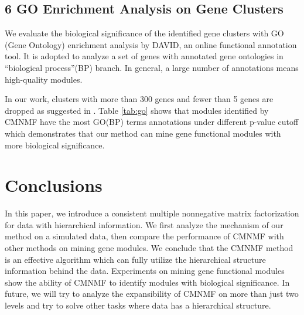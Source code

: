 \documentclass{bmcart}
\begin{document}
\subsection*{6 GO Enrichment Analysis on Gene Clusters}

We evaluate the biological significance of the identified gene clusters with GO (Gene Ontology) enrichment analysis by DAVID\cite{David}, an online functional annotation tool. It is adopted to analyze a set of genes with annotated gene ontologies in ``biological process''(BP) branch. In general, a large number of annotations means high-quality modules.

In our work, clusters with more than 300 genes and fewer than 5 genes are dropped as suggested in \cite{SMNMF}. Table \ref{tab:go} shows that modules identified by CMNMF have the most GO(BP) terms annotations under different p-value cutoff which demonstrates that our method can mine gene functional modules with more biological significance.

\section*{Conclusions}
In this paper, we introduce a consistent multiple nonnegative matrix factorization for data with hierarchical information. We first analyze the mechanism of our method on a simulated data, then compare the performance of CMNMF with other methods on mining gene modules. We conclude that the CMNMF method is an effective algorithm which can fully utilize the hierarchical structure information behind the data. Experiments on mining gene functional modules show the ability of CMNMF to identify modules with biological significance. In future, we will try to analyze the expansibility of CMNMF on more than just two levels and try to solve other tasks where data has a hierarchical structure.


\end{document}

